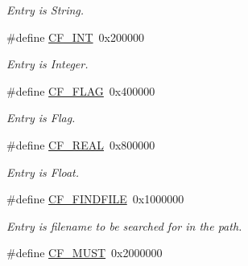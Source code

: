 \begin{CompactItemize}
\begin{CompactList}\small\item\em Entry is String. \item\end{CompactList}\item 
\hypertarget{group__special__options__mask_gb33869d596619ad14675c053925a42e0}{
\#define \hyperlink{group__special__options__mask_gb33869d596619ad14675c053925a42e0}{CF\_\-INT}~0x200000}
\label{group__special__options__mask_gb33869d596619ad14675c053925a42e0}

\begin{CompactList}\small\item\em Entry is Integer. \item\end{CompactList}\item 
\hypertarget{group__special__options__mask_g1d1f1d1b6eac6b5d9970102318ab2667}{
\#define \hyperlink{group__special__options__mask_g1d1f1d1b6eac6b5d9970102318ab2667}{CF\_\-FLAG}~0x400000}
\label{group__special__options__mask_g1d1f1d1b6eac6b5d9970102318ab2667}

\begin{CompactList}\small\item\em Entry is Flag. \item\end{CompactList}\item 
\hypertarget{group__special__options__mask_geefdbef320cbd7179f1fb0ebe0fcf5ce}{
\#define \hyperlink{group__special__options__mask_geefdbef320cbd7179f1fb0ebe0fcf5ce}{CF\_\-REAL}~0x800000}
\label{group__special__options__mask_geefdbef320cbd7179f1fb0ebe0fcf5ce}

\begin{CompactList}\small\item\em Entry is Float. \item\end{CompactList}\item 
\hypertarget{group__special__options__mask_g675b6f8440beecc09fec54d17e9c3ee9}{
\#define \hyperlink{group__special__options__mask_g675b6f8440beecc09fec54d17e9c3ee9}{CF\_\-FINDFILE}~0x1000000}
\label{group__special__options__mask_g675b6f8440beecc09fec54d17e9c3ee9}

\begin{CompactList}\small\item\em Entry is filename to be searched for in the path. \item\end{CompactList}\item 
\hypertarget{group__special__options__mask_g3229f5b038eaa0c6428361d2aa510dfc}{
\#define \hyperlink{group__special__options__mask_g3229f5b038eaa0c6428361d2aa510dfc}{CF\_\-MUST}~0x2000000}
\label{group__special__options__mask_g3229f5b038eaa0c6428361d2aa510dfc}


\end{CompactItemize}
